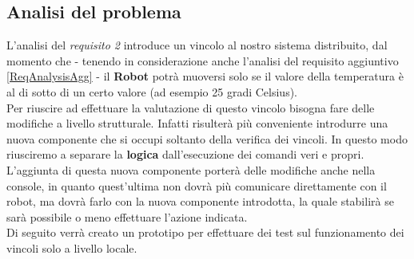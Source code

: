 \documentclass{llncs}
\begin{document}
\subsection{Analisi del problema}
\label{AnalisidelproblemaReq2}
L'analisi del \textit{requisito 2} introduce un vincolo al nostro sistema distribuito, dal momento che - tenendo in considerazione anche l'analisi del requisito aggiuntivo \hyperref[ReqAnalysisAgg]{\ref{ReqAnalysisAgg}} - il \textbf{Robot} potr\`a muoversi solo se il valore della temperatura \`e al di sotto di un certo valore (ad esempio 25 gradi Celsius). \\
Per riuscire ad effettuare la valutazione di questo vincolo bisogna fare delle modifiche a livello strutturale. Infatti risulter\`a pi\`u conveniente introdurre una nuova componente che si occupi soltanto della verifica dei vincoli. In questo modo riusciremo a separare la \textbf{logica} dall'esecuzione dei comandi veri e propri.\\
L'aggiunta di questa nuova componente porter\`a delle modifiche anche nella console, in quanto quest'ultima non dovr\`a pi\`u comunicare direttamente con il robot, ma dovr\`a farlo con la nuova componente introdotta, la quale stabilir\`a se sar\`a possibile o meno effettuare l'azione indicata.\\
Di seguito verr\`a creato un prototipo per effettuare dei test sul funzionamento dei vincoli solo a livello locale.

\end{document}
